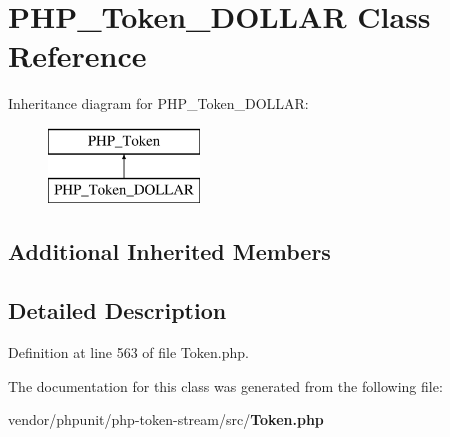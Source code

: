 \section{P\+H\+P\+\_\+\+Token\+\_\+\+D\+O\+L\+L\+A\+R Class Reference}
\label{class_p_h_p___token___d_o_l_l_a_r}
Inheritance diagram for P\+H\+P\+\_\+\+Token\+\_\+\+D\+O\+L\+L\+A\+R\+:\begin{figure}[H]
\begin{center}
\leavevmode
\includegraphics[height=2.000000cm]{class_p_h_p___token___d_o_l_l_a_r}
\end{center}
\end{figure}
\subsection*{Additional Inherited Members}


\subsection{Detailed Description}


Definition at line 563 of file Token.\+php.



The documentation for this class was generated from the following file\+:\begin{DoxyCompactItemize}
\item 
vendor/phpunit/php-\/token-\/stream/src/{\bf Token.\+php}\end{DoxyCompactItemize}
